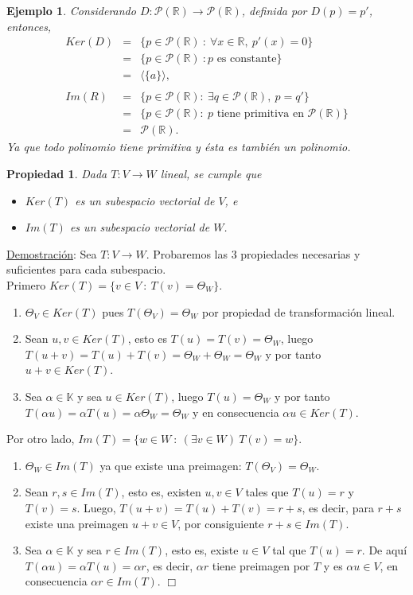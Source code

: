 \documentclass[12pt]{book}
\newtheorem{prop}{Propiedad}
\newtheorem{ejem}{Ejemplo}
\def\R{\mathbb{R}}
\def\K{\mathbb{K}}
\def\P{\mathcal{P}}
\begin{document}
\begin{ejem}{\em
Considerando $D:\P(\R)\rightarrow\P(\R)$, definida por $D(p)=p'$, entonces,
\begin{eqnarray*}
Ker(D)&=&\{ p\in\P(\R) \ :\ \forall x\in\R,\ p'(x)=0\}\\
&=&\{p\in\P(\R) \ : p\textrm{ es constante}\}\\
&=&\langle\{ a\}\rangle,\\
\\
Im(R)&=&\{p\in\P(\R) :\ \exists q\in\P(\R),\  p=q'\}\\
&=&\{p\in\P(\R) :\ p \textrm{ tiene primitiva en }\P(\R)\}\\
&=&\P(\R).
\end{eqnarray*}
Ya que todo polinomio tiene primitiva y ésta es también un polinomio.
}
\end{ejem}


 \begin{prop}
 Dada $T:V\rightarrow W$ lineal, se cumple que 
 \begin{itemize}
 \item $Ker(T)$ es un subespacio vectorial de $V$, e
 \item $Im(T)$ es un subespacio vectorial de $W$.
 \end{itemize}
 \end{prop}
 
 \underline{Demostración}:
Sea $T:V\rightarrow W$. Probaremos las 3 propiedades necesarias y suficientes para cada subespacio.\\

Primero $Ker(T)=\{ v\in V\ :\ T(v)=\Theta_W\}$.
\begin{enumerate}
\item $\Theta_V\in Ker(T)$ pues $T(\Theta_V)=\Theta_W$ por propiedad de transformaci\'on lineal.
\item Sean $u,v\in Ker(T)$, esto es $T(u)=T(v)=\Theta_W$, luego $T(u+v)=T(u)+T(v)=\Theta_W+\Theta_W=\Theta_W$ y por tanto $u+v\in Ker(T)$.
\item Sea $\alpha \in\K$ y sea $u\in Ker(T)$, luego $T(u)=\Theta_W$ y por tanto $T(\alpha u)=\alpha T(u)=\alpha \Theta_W=\Theta_W$ y en consecuencia $\alpha u\in Ker(T)$.
\end{enumerate}

\vspace{0.3 cm}


Por otro lado,  $Im(T)=\{ w\in W\ :\ (\exists v\in W)\ T(v)=w\}$.
\begin{enumerate}
\item $\Theta_W\in Im(T)$ ya que existe una preimagen: $T(\Theta_V)=\Theta_W$.
\item Sean $r,s\in Im(T)$, esto es, existen $u,v\in V$ tales que  $T(u)=r$ y $T(v)=s$.
Luego, $T(u+v)=T(u)+T(v)=r+s$, es decir, para $r+s$ existe una preimagen $u+v\in V$, por consiguiente $r+s\in Im(T)$.
\item Sea $\alpha \in\K$ y sea $r\in Im(T)$, esto es, existe $u\in V$ tal que $T(u)=r$.
De aqu\'i $T(\alpha u)=\alpha T(u)=\alpha r$, es decir, $\alpha r$ tiene preimagen por $T$ y es $\alpha u \in V$, en consecuencia $\alpha r \in Im(T)$.  \hfill $\Box$

\end{enumerate}
 
\end{document}
